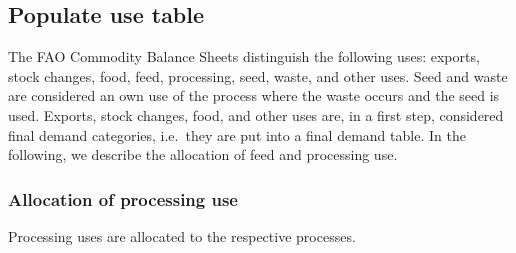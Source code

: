 \documentclass[]{article}
\begin{document}
\subsection{Populate use table}\label{populate-use-table}

The FAO Commodity Balance Sheets distinguish the following uses:
exports, stock changes, food, feed, processing, seed, waste, and other
uses. Seed and waste are considered an own use of the process where the
waste occurs and the seed is used. Exports, stock changes, food, and
other uses are, in a first step, considered final demand categories,
i.e.~they are put into a final demand table. In the following, we
describe the allocation of feed and processing use.

\subsubsection{Allocation of processing
use}\label{allocation-of-processing-use}

Processing uses are allocated to the respective processes.
\end{document}
